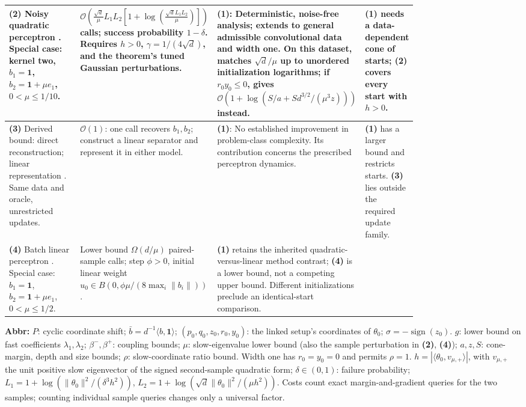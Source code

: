 \begin{table}[tp]
\begin{threeparttable}
\begin{tabularx}{\linewidth}{@{}>{\raggedright\arraybackslash}p{0.20\linewidth}>{\raggedright\arraybackslash}p{0.32\linewidth}>{\raggedright\arraybackslash}p{0.27\linewidth}>{\raggedright\arraybackslash}X@{}}
\midrule[1.2pt]
\textbf{(2)} Noisy quadratic perceptron \citep[Thm.~5.1, v2]{tqpTyurin2026v2}. Special case: kernel two, $b_1=\mathbf1$, $b_2=\mathbf1+\mu e_1$, $0<\mu\le1/10$.
& $\mathcal{O}\!\left(\frac{\sqrt d}{\mu}L_1L_2\left[1+\log\!\left(\frac{\sqrt d L_1L_2}{\mu}\right)\right]\right)$ calls; success probability $1-\delta$. Requires $h>0$, $\gamma=1/(4\sqrt d)$, and the theorem's tuned Gaussian perturbations.
& \textbf{(1)}: Deterministic, noise-free analysis; extends to general admissible convolutional data and width one. On this dataset, matches $\sqrt d/\mu$ up to unordered initialization logarithms; if $r_0y_0\le0$, gives $\mathcal{O}(1+\log(S/a+Sd^{3/2}/(\mu^3z)))$ instead.
& \textbf{(1)} needs a data-dependent cone of starts; \textbf{(2)} covers every start with $h>0$. \\
\midrule
\textbf{(3)} Derived bound: direct reconstruction; linear representation \citep[Sec.~1.1]{tqpTyurin2026v2}. Same data and oracle, unrestricted updates.
& $\mathcal{O}(1)$: one call recovers $b_1,b_2$; construct a linear separator and represent it in either model.
& \textbf{(1)}: No established improvement in problem-class complexity. Its contribution concerns the prescribed perceptron dynamics.
& \textbf{(1)} has a larger bound and restricts starts. \textbf{(3)} lies outside the required update family. \\
\midrule
\textbf{(4)} Batch linear perceptron \citep[Thm.~5.2, v2]{tqpTyurin2026v2}. Special case: $b_1=\mathbf1$, $b_2=\mathbf1+\mu e_1$, $0<\mu\le1/2$.
& Lower bound $\Omega(d/\mu)$ paired-sample calls; step $\phi>0$, initial linear weight $u_0\in B(0,\phi\mu/(8\max_i\|b_i\|))$.
& \textbf{(1)} retains the inherited quadratic-versus-linear method contrast; \textbf{(4)} is a lower bound, not a competing upper bound. Different initializations preclude an identical-start comparison.
& \\
\bottomrule
\end{tabularx}
\begin{tablenotes}[flushleft]\footnotesize
\item[] \textbf{Abbr:} $P$: cyclic coordinate shift; $\bar b=d^{-1}\langle b,\mathbf1\rangle$; $(p_0,q_0,z_0,r_0,y_0)$: the linked setup's coordinates of $\theta_0$; $\sigma=-\operatorname{sign}(z_0)$. $g$: lower bound on fast coefficients $\lambda_1,\lambda_2$; $\beta^-,\beta^+$: coupling bounds; $\mu$: slow-eigenvalue lower bound (also the sample perturbation in \textbf{(2)}, \textbf{(4)}); $a,z,S$: cone-margin, depth and size bounds; $\rho$: slow-coordinate ratio bound. Width one has $r_0=y_0=0$ and permits $\rho=1$. $h=|\langle\theta_0,v_{\mu,+}\rangle|$, with $v_{\mu,+}$ the unit positive slow eigenvector of the signed second-sample quadratic form; $\delta\in(0,1)$: failure probability; $L_1=1+\log(\|\theta_0\|^2/(\delta^3h^2))$, $L_2=1+\log(\sqrt d\|\theta_0\|^2/(\mu h^2))$. Costs count exact margin-and-gradient queries for the two samples; counting individual sample queries changes only a universal factor.

\end{tablenotes}
\end{threeparttable}
\end{table}
